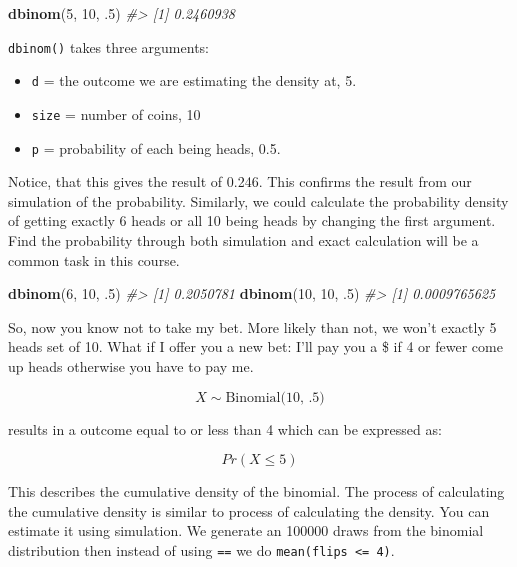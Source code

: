 \documentclass[]{article}
\newenvironment{Shaded}{\begin{snugshade}}{\end{snugshade}}
\newcommand{\CommentTok}[1]{\textcolor[rgb]{0.56,0.35,0.01}{\textit{#1}}}
\newcommand{\DecValTok}[1]{\textcolor[rgb]{0.00,0.00,0.81}{#1}}
\newcommand{\FloatTok}[1]{\textcolor[rgb]{0.00,0.00,0.81}{#1}}
\newcommand{\KeywordTok}[1]{\textcolor[rgb]{0.13,0.29,0.53}{\textbf{#1}}}
\newcommand{\NormalTok}[1]{#1}
\providecommand{\tightlist}{%
  \setlength{\itemsep}{0pt}\setlength{\parskip}{0pt}}
\begin{document}
\begin{Shaded}
\begin{Highlighting}[]
\KeywordTok{dbinom}\NormalTok{(}\DecValTok{5}\NormalTok{, }\DecValTok{10}\NormalTok{, }\FloatTok{.5}\NormalTok{)}
\CommentTok{#> [1] 0.2460938}
\end{Highlighting}
\end{Shaded}

\texttt{dbinom()} takes three arguments:

\begin{itemize}
\tightlist
\item
  \texttt{d} = the outcome we are estimating the density at, 5.
\item
  \texttt{size} = number of coins, 10
\item
  \texttt{p} = probability of each being heads, 0.5.
\end{itemize}

Notice, that this gives the result of 0.246. This confirms the result
from our simulation of the probability. Similarly, we could calculate
the probability density of getting exactly 6 heads or all 10 being heads
by changing the first argument. Find the probability through both
simulation and exact calculation will be a common task in this course.

\begin{Shaded}
\begin{Highlighting}[]
\KeywordTok{dbinom}\NormalTok{(}\DecValTok{6}\NormalTok{, }\DecValTok{10}\NormalTok{, }\FloatTok{.5}\NormalTok{)}
\CommentTok{#> [1] 0.2050781}
\KeywordTok{dbinom}\NormalTok{(}\DecValTok{10}\NormalTok{, }\DecValTok{10}\NormalTok{, }\FloatTok{.5}\NormalTok{)}
\CommentTok{#> [1] 0.0009765625}
\end{Highlighting}
\end{Shaded}

So, now you know not to take my bet. More likely than not, we won't
exactly 5 heads set of 10. What if I offer you a new bet: I'll pay you a
\$ if 4 or fewer come up heads otherwise you have to pay me.

\[X  \sim \textrm{Binomial(10, .5)} \]

results in a outcome equal to or less than 4 which can be expressed as:

\[Pr (X \le 5)\]

This describes the cumulative density of the binomial. The process of
calculating the cumulative density is similar to process of calculating
the density. You can estimate it using simulation. We generate an 100000
draws from the binomial distribution then instead of using \texttt{==}
we do \texttt{mean(flips\ \textless{}=\ 4)}.
\end{document}
